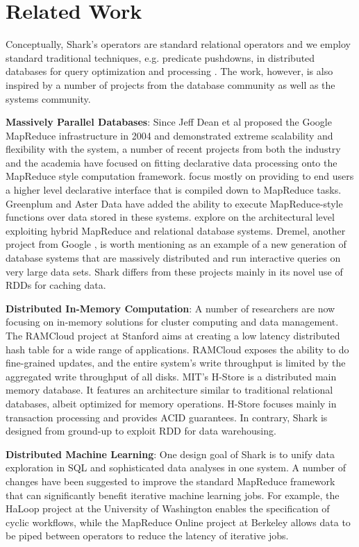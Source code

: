 
\section{Related Work}

Conceptually, Shark's operators are standard relational operators and we employ standard traditional techniques, e.g. predicate pushdowns, in distributed databases for query optimization and processing \cite{distributed-db-ozsu}. The work, however, is also inspired by a number of projects from the database community as well as the systems community.

\textbf{Massively Parallel Databases}: Since Jeff Dean et al proposed the Google MapReduce infrastructure in 2004 \cite{mapreduce} and demonstrated extreme scalability and flexibility with the system, a number of recent projects from both the industry and the academia have focused on fitting declarative data processing onto the MapReduce style computation framework. \cite{hive, pig, tenzing, hyracks, asterix} focus mostly on providing to end users a higher level declarative interface that is compiled down to MapReduce tasks. Greenplum and Aster Data have added the ability to execute MapReduce-style functions over data stored in these systems. \cite{hadoopdb, split-execution} explore on the architectural level exploiting hybrid MapReduce and relational database systems. Dremel, another project from Google \cite{dremel}, is worth mentioning as an example of a new generation of database systems that are massively distributed and run interactive queries on very large data sets. Shark differs from these projects mainly in its novel use of RDDs for caching data.

\textbf{Distributed In-Memory Computation}: A number of researchers are now focusing on in-memory solutions for cluster computing and data management. The RAMCloud project at Stanford \cite{ramcloud} aims at creating a low latency distributed hash table for a wide range of applications. RAMCloud exposes the ability to do fine-grained updates, and the entire system's write throughput is limited by the aggregated write throughput of all disks. MIT's H-Store \cite{hstore} is a distributed main memory database. It features an architecture similar to traditional relational databases, albeit optimized for memory operations. H-Store focuses mainly in transaction processing and provides ACID guarantees. In contrary, Shark is designed from ground-up to exploit RDD for data warehousing.

\textbf{Distributed Machine Learning}: One design goal of Shark is to unify data exploration in SQL and sophisticated data analyses in one system. A number of changes have been suggested to improve the standard MapReduce framework that can significantly benefit iterative machine learning jobs. For example, the HaLoop project at the University of Washington \cite{haloop} enables the specification of cyclic workflows, while the MapReduce Online project at Berkeley \cite{mapreduce-online} allows data to be piped between operators to reduce the latency of iterative jobs.

